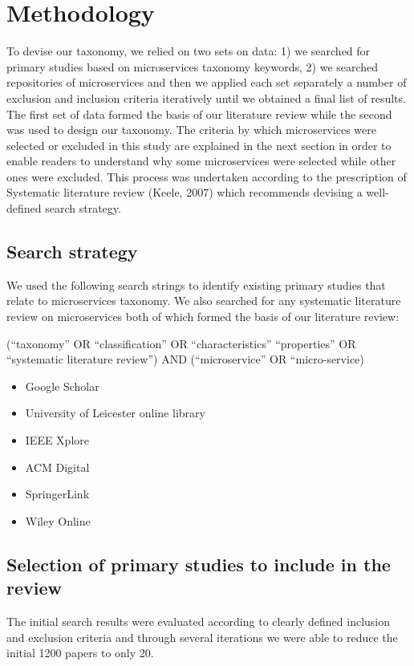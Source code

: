 \documentclass{article}
\begin{document}
\section{Methodology}


To devise our taxonomy, we relied on two sets on data: 1) we searched for primary studies based on microservices taxonomy keywords, 2) we searched repositories of microservices and then we applied each set separately a number of exclusion and inclusion criteria iteratively until we obtained a final list of results. The first set of data formed the basis of our literature review while the second was used to design our taxonomy. The criteria by which microservices were selected or excluded in this study are explained in the next section in order to enable readers to understand why some microservices were selected while other ones were excluded. This process was undertaken according to the prescription of Systematic literature review (Keele, 2007) which recommends devising a well-defined search strategy.


\subsection{Search strategy}


We used the following search strings to identify existing primary studies that relate to microservices taxonomy. We also searched for any systematic literature review on microservices both of which formed the basis of our literature review:


(“taxonomy” OR “classification” OR “characteristics” “properties” OR “systematic literature review”) AND (“microservice” OR “micro-service)


\begin{itemize}
\item Google Scholar
\item University of Leicester online library
\item IEEE Xplore
\item ACM Digital
\item SpringerLink
\item Wiley Online
\end{itemize}

\subsection{Selection of primary studies to include in the review}

The initial search results were evaluated according to clearly defined inclusion and exclusion criteria and through several iterations we were able to reduce the initial 1200 papers to only 20.
\end{document}
